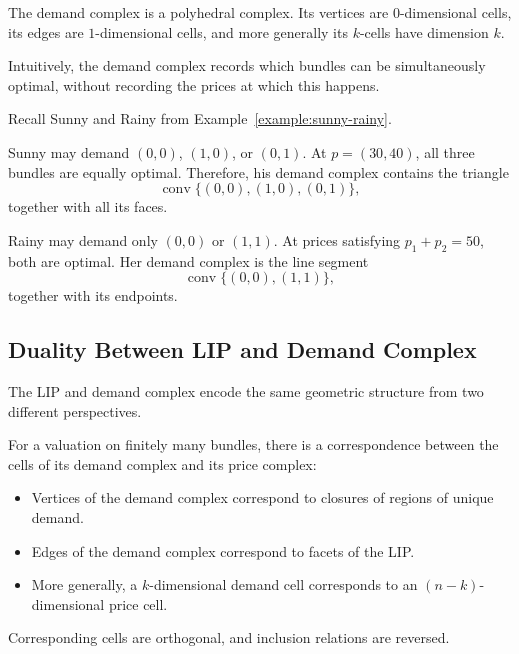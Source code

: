 \documentclass[../../main.tex]{subfiles}
\begin{document}
The demand complex is a polyhedral complex. Its vertices
are $0$-dimensional cells, its edges are $1$-dimensional cells,
and more generally its $k$-cells have dimension $k$.

Intuitively, the demand complex records which bundles can be
simultaneously optimal, without recording the prices at which
this happens.

\begin{example}
    Recall Sunny and Rainy from Example~\ref{example:sunny-rainy}.

    Sunny may demand $(0,0)$, $(1,0)$, or $(0,1)$.
    At $p=(30,40)$, all three bundles are equally optimal.
    Therefore, his demand complex contains the triangle
    \[
        \operatorname{conv}\{(0,0),(1,0),(0,1)\},
    \]
    together with all its faces.

    Rainy may demand only $(0,0)$ or $(1,1)$.
    At prices satisfying $p_1+p_2=50$, both are optimal.
    Her demand complex is the line segment
    \[
        \operatorname{conv}\{(0,0),(1,1)\},
    \]
    together with its endpoints.

\end{example}

\subsection{Duality Between LIP and Demand Complex}

The LIP and demand complex encode the same geometric
structure from two different perspectives.

\begin{thm}
    For a valuation on finitely many bundles, there is a
    correspondence between the cells of its demand complex 
    and its price complex:
    \begin{itemize}
        \item Vertices of the demand complex correspond to
        closures of regions of unique demand.
        \item Edges of the demand complex correspond to
        facets of the LIP.
        \item More generally, a $k$-dimensional demand cell
        corresponds to an $(n-k)$-dimensional price cell.
    \end{itemize}
    
    Corresponding cells are orthogonal, and inclusion
    relations are reversed.
\end{thm}
\end{document}
